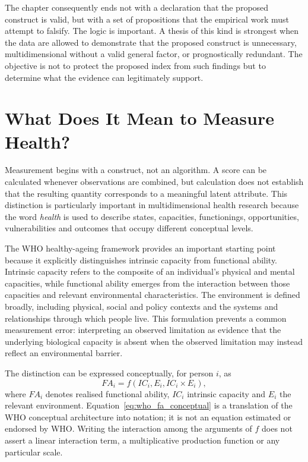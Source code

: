 The chapter consequently ends not with a declaration that the proposed construct is valid, but with a set of propositions that the empirical work must attempt to falsify. The logic is important. A thesis of this kind is strongest when the data are allowed to demonstrate that the proposed construct is unnecessary, multidimensional without a valid general factor, or prognostically redundant. The objective is not to protect the proposed index from such findings but to determine what the evidence can legitimately support.

\section{What Does It Mean to Measure Health?}

Measurement begins with a construct, not an algorithm. A score can be calculated whenever observations are combined, but calculation does not establish that the resulting quantity corresponds to a meaningful latent attribute. This distinction is particularly important in multidimensional health research because the word \emph{health} is used to describe states, capacities, functionings, opportunities, vulnerabilities and outcomes that occupy different conceptual levels.

The WHO healthy-ageing framework provides an important starting point because it explicitly distinguishes intrinsic capacity from functional ability. Intrinsic capacity refers to the composite of an individual's physical and mental capacities, while functional ability emerges from the interaction between those capacities and relevant environmental characteristics. The environment is defined broadly, including physical, social and policy contexts and the systems and relationships through which people live. \cite{who_2015_ageing,who_healthy_ageing_2026} This formulation prevents a common measurement error: interpreting an observed limitation as evidence that the underlying biological capacity is absent when the observed limitation may instead reflect an environmental barrier.

The distinction can be expressed conceptually, for person $i$, as
\begin{equation}
\boxed{FA_i=f(IC_i,E_i,IC_i\times E_i)},
\label{eq:who_fa_conceptual}
\end{equation}
where $FA_i$ denotes realised functional ability, $IC_i$ intrinsic capacity and
$E_i$ the relevant environment. Equation~\ref{eq:who_fa_conceptual} is a
translation of the WHO conceptual architecture into notation; it is not an
equation estimated or endorsed by WHO. Writing the interaction among the
arguments of $f$ does not assert a linear interaction term, a multiplicative
production function or any particular scale.

